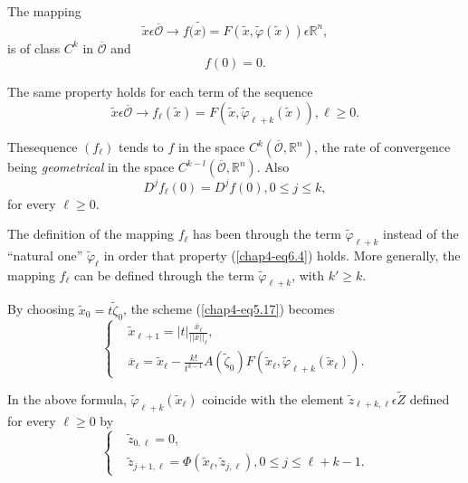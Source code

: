The mapping
\begin{equation*}
\widetilde{x} \epsilon \overline{\mathscr{O}} \to f(\widetilde{x)} =
F(\widetilde{x}, \widetilde{\varphi}(\widetilde{x})) \epsilon
\mathbb{R}^{n},\tag{6.2}\label{chap4-eq6.2} 
\end{equation*}
is of class $C^{k}$ in $\overline{\mathscr{O}}$ and 
$$
f(0) = 0.
$$

The same property holds for each term of the sequence
\begin{equation*}
\widetilde{x} \epsilon \overline{\mathscr{O}} \to
f_{\ell}(\widetilde{x}) = F(\widetilde{x}, \widetilde{\varphi}_{\ell +
k}(\widetilde{x})), \ell \geq 0.\tag{6.3}\label{chap4-eq6.3}
\end{equation*}

The\pageoriginale sequence $(f_{\ell})$ tends to $f$ in the space
$C^{k}(\overline{\mathscr{O}}, \mathbb{R}^{n})$, the rate of convergence being {\em geometrical} in the space $C^{k-l} (\overline{\mathscr{O}}, \mathbb{R}^n)$. Also
\begin{equation*}
D^{j}f_{\ell}(0) = D^{j}f(0), 0 \leq j \leq k,\tag{6.4}\label{chap4-eq6.4}
\end{equation*}
for every $\ell \geq 0$.

\begin{remark}\label{chap4-rem6.1}
The definition of the mapping $f_{\ell}$ has been through the term
$\widetilde{\varphi}_{\ell + k}$ instead of the ``natural one''
$\widetilde{\varphi}_{\ell}$ in order that property
(\ref{chap4-eq6.4}) holds. More generally, the mapping $f_{\ell}$ can
be defined through the term $\widetilde{\varphi}_{\ell + k}$, with $k'
\geq k$.
\end{remark}

By choosing $\widetilde{x}_{0} = t\widetilde{\zeta}_{0}$, the scheme
(\ref{chap4-eq5.17}) becomes
\begin{equation*}
\begin{cases}
& \widetilde{x}_{\ell + 1} = |t|
  \frac{\overline{x}_{\ell}}{||\overline{x}||_{\ell}},\\
& \overline{x}_{\ell} = \widetilde{x}_{\ell} - \frac{k!}{t^{k-1}}
  A(\widetilde{\zeta}_{0}) F(\widetilde{x}_{\ell},
  \widetilde{\varphi}_{\ell + k} (\widetilde{x}_{\ell})).
\end{cases}
\end{equation*}

In the above formula, $\widetilde{\varphi}_{\ell + k}
(\widetilde{x}_{\ell})$ coincide with the element $\widetilde{z}_{\ell
+ k, \ell} \epsilon \widetilde{Z}$ defined for every $\ell \geq 0$ by
\begin{equation*}
\begin{cases}
& \widetilde{z}_{0, \ell} = 0,\\
& \widetilde{z}_{j+1, \ell} = \Phi(\widetilde{x}_{\ell},
  \widetilde{z}_{j, \ell}), 0 \leq j \leq \ell+k-1.
\end{cases}
\end{equation*}


